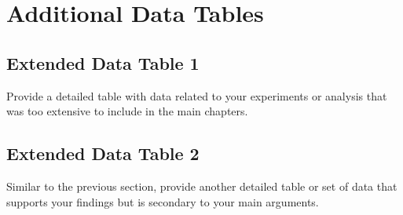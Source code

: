 \chapter{Additional Data Tables}
\label{appendix:A}

\section{Extended Data Table 1}
Provide a detailed table with data related to your experiments or analysis that was too extensive to include in the main chapters.

\section{Extended Data Table 2}
Similar to the previous section, provide another detailed table or set of data that supports your findings but is secondary to your main arguments.
